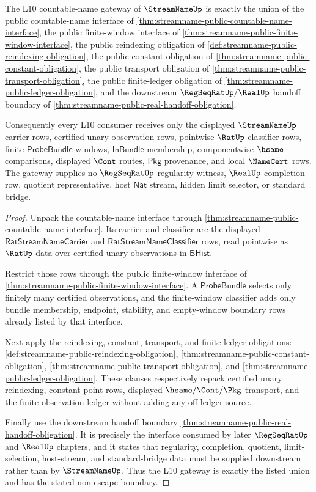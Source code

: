\begin{theorem}
\label{thm:streamname-l10-architectural-gate-stability-surface}
The L10 countable-name gateway of $\StreamNameUp$ is exactly the union of the
public countable-name interface of
\autoref{thm:streamname-public-countable-name-interface}, the public
finite-window interface of
\autoref{thm:streamname-public-finite-window-interface}, the public reindexing
obligation of \autoref{def:streamname-public-reindexing-obligation}, the public
constant obligation of \autoref{thm:streamname-public-constant-obligation}, the
public transport obligation of \autoref{thm:streamname-public-transport-obligation},
the public finite-ledger obligation of
\autoref{thm:streamname-public-ledger-obligation}, and the downstream
$\RegSeqRatUp/\RealUp$ handoff boundary of
\autoref{thm:streamname-public-real-handoff-obligation}.

Consequently every L10 consumer receives only the displayed
$\StreamNameUp$ carrier rows, certified unary observation rows, pointwise
$\RatUp$ classifier rows, finite $\mathsf{ProbeBundle}$ windows,
$\mathsf{InBundle}$ membership, componentwise $\hsame$ comparisons, displayed
$\Cont$ routes, $\mathsf{Pkg}$ provenance, and local $\NameCert$ rows. The
gateway supplies no $\RegSeqRatUp$ regularity witness, $\RealUp$ completion row,
quotient representative, host $\mathsf{Nat}$ stream, hidden limit selector, or
standard bridge.
\end{theorem}
\begin{proof}
Unpack the countable-name interface through
\autoref{thm:streamname-public-countable-name-interface}. Its carrier and
classifier are the displayed $\mathsf{RatStreamNameCarrier}$ and
$\mathsf{RatStreamNameClassifier}$ rows, read pointwise as $\RatUp$ data over
certified unary observations in $\mathsf{BHist}$.

Restrict those rows through the public finite-window interface of
\autoref{thm:streamname-public-finite-window-interface}. A
$\mathsf{ProbeBundle}$ selects only finitely many certified observations, and
the finite-window classifier adds only bundle membership, endpoint, stability,
and empty-window boundary rows already listed by that interface.

Next apply the reindexing, constant, transport, and finite-ledger obligations:
\autoref{def:streamname-public-reindexing-obligation},
\autoref{thm:streamname-public-constant-obligation},
\autoref{thm:streamname-public-transport-obligation}, and
\autoref{thm:streamname-public-ledger-obligation}. These clauses respectively
repack certified unary reindexing, constant point rows, displayed
$\hsame/\Cont/\Pkg$ transport, and the finite observation ledger without adding
any off-ledger source.

Finally use the downstream handoff boundary
\autoref{thm:streamname-public-real-handoff-obligation}. It is precisely the
interface consumed by later $\RegSeqRatUp$ and $\RealUp$ chapters, and it states
that regularity, completion, quotient, limit-selection, host-stream, and
standard-bridge data must be supplied downstream rather than by $\StreamNameUp$.
Thus the L10 gateway is exactly the listed union and has the stated non-escape
boundary.
\end{proof}
